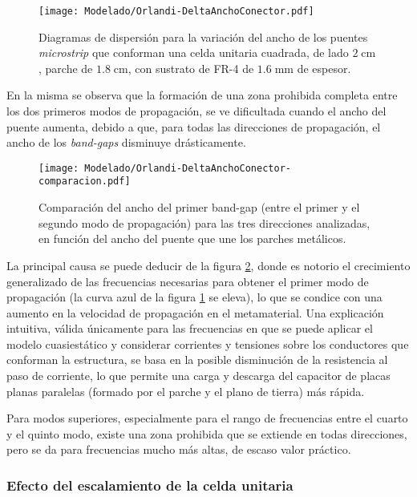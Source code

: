 \begin{figure}[h]
	\centering
	\texttt{[image: Modelado/Orlandi-DeltaAnchoConector.pdf]}
	\caption{Diagramas de dispersión para la variación del ancho de los puentes \textit{microstrip} que conforman una celda unitaria cuadrada, de lado $2\;\text{cm}$, parche de $1.8\;\text{cm}$, con sustrato de FR-4 de $1.6\;\text{mm}$ de espesor.}
	\label{fig:diagdisp-orlandi-variacion-ancho-puente}
\end{figure}

En la misma se observa que la formación de una zona prohibida completa entre los dos primeros modos de propagación, se ve dificultada cuando el ancho del puente aumenta, debido a que, para todas las direcciones de propagación, el ancho de los \textit{band-gaps} disminuye drásticamente.


\begin{figure}[h]
	\centering
	\texttt{[image: Modelado/Orlandi-DeltaAnchoConector-comparacion.pdf]}
	\caption{Comparación del ancho del primer band-gap (entre el primer y el segundo modo de propagación) para las tres direcciones analizadas, en función del ancho del puente que une los parches metálicos.}
	\label{fig:comparacion-diagdisp-orlandi-variacion-ancho-puente}
\end{figure}

La principal causa se puede deducir de la figura \ref{fig:comparacion-diagdisp-orlandi-variacion-ancho-puente}, donde es notorio el crecimiento generalizado de las frecuencias necesarias para obtener el primer modo de propagación (la curva azul de la figura \ref{fig:diagdisp-orlandi-variacion-ancho-puente} se eleva), lo que se condice con una aumento en la velocidad de propagación en el metamaterial. Una explicación intuitiva, válida únicamente para las frecuencias en que se puede aplicar el modelo cuasiestático y considerar corrientes y tensiones sobre los conductores que conforman la estructura, se basa en la posible disminución de la resistencia al paso de corriente, lo que permite una carga y descarga del capacitor de placas planas paralelas (formado por el parche y el plano de tierra) más rápida.

Para modos superiores, especialmente para el rango de frecuencias entre el cuarto y el quinto modo, existe una zona prohibida que se extiende en todas direcciones, pero se da para frecuencias mucho más altas, de escaso valor práctico.

\clearpage
\subsubsection{Efecto del escalamiento de la celda unitaria}


